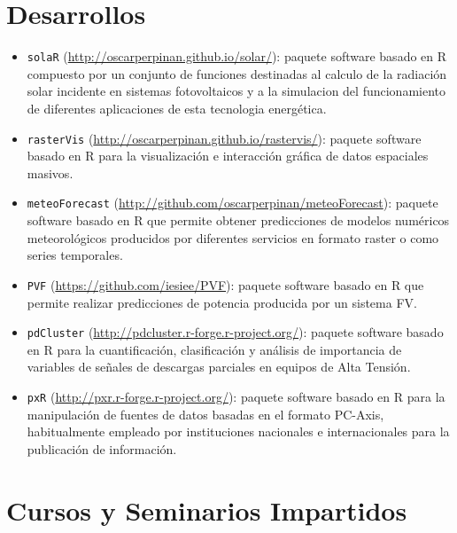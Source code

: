 \documentclass[article, a4paper]{memoir}
\begin{document}
\section{Desarrollos}
\label{sec-7}

\begin{itemize}
\item \texttt{solaR} (\url{http://oscarperpinan.github.io/solar/}): paquete software basado en R compuesto por un conjunto de funciones destinadas al calculo de la radiación solar incidente en sistemas fotovoltaicos y a la simulacion del funcionamiento de diferentes aplicaciones de esta tecnologia energética.

\item \texttt{rasterVis} (\url{http://oscarperpinan.github.io/rastervis/}): paquete software basado en R para la visualización e interacción gráfica de datos espaciales masivos.

\item \texttt{meteoForecast} (\url{http://github.com/oscarperpinan/meteoForecast}): paquete software basado en R que permite obtener predicciones de modelos numéricos meteorológicos producidos por diferentes servicios en formato raster o como series temporales.

\item \texttt{PVF} (\url{https://github.com/iesiee/PVF}): paquete software basado en R que permite realizar predicciones de potencia producida por un sistema FV.
\item \texttt{pdCluster} (\url{http://pdcluster.r-forge.r-project.org/}): paquete software basado en R para la cuantificación, clasificación y análisis de importancia de variables de señales de descargas parciales en equipos de Alta Tensión.

\item \texttt{pxR} (\url{http://pxr.r-forge.r-project.org/}): paquete software basado en R para la manipulación de fuentes de datos basadas en el formato PC-Axis, habitualmente empleado por instituciones nacionales e internacionales para la publicación de información.
\end{itemize}



\section{Cursos y Seminarios Impartidos}
\label{sec-8}
\end{document}
